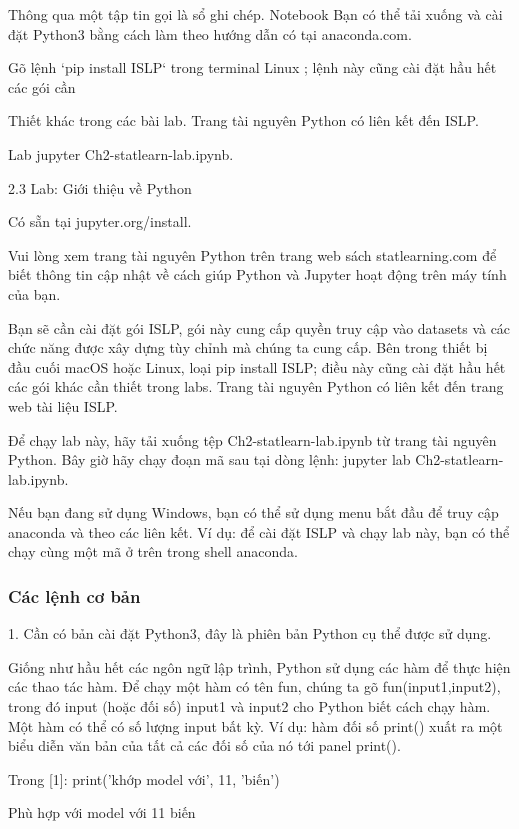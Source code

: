 Thông qua một tập tin gọi là sổ ghi chép. Notebook Bạn có thể tải xuống và cài đặt Python3 bằng cách làm theo hướng dẫn có tại anaconda.com.

Gõ lệnh `pip install ISLP` trong terminal Linux ; lệnh này cũng cài đặt hầu hết các gói cần

Thiết khác trong các bài lab. Trang tài nguyên Python có liên kết đến ISLP.

Lab jupyter Ch2-statlearn-lab.ipynb.

2.3 Lab: Giới thiệu về Python

Có sẵn tại jupyter.org/install.

Vui lòng xem trang tài nguyên Python trên trang web sách statlearning.com để biết thông tin cập nhật về cách giúp Python và Jupyter hoạt động trên máy tính của bạn.

Bạn sẽ cần cài đặt gói ISLP, gói này cung cấp quyền truy cập vào datasets và các chức năng được xây dựng tùy chỉnh mà chúng ta cung cấp. Bên trong thiết bị đầu cuối macOS hoặc Linux, loại pip install ISLP; điều này cũng cài đặt hầu hết các gói khác cần thiết trong labs. Trang tài nguyên Python có liên kết đến trang web tài liệu ISLP.

Để chạy lab này, hãy tải xuống tệp Ch2-statlearn-lab.ipynb từ trang tài nguyên Python. Bây giờ hãy chạy đoạn mã sau tại dòng lệnh: jupyter lab Ch2-statlearn-lab.ipynb.

Nếu bạn đang sử dụng Windows, bạn có thể sử dụng menu bắt đầu để truy cập anaconda và theo các liên kết. Ví dụ: để cài đặt ISLP và chạy lab này, bạn có thể chạy cùng một mã ở trên trong shell anaconda.

\subsubsection{Các lệnh cơ bản}

1. Cần có bản cài đặt Python3, đây là phiên bản Python cụ thể được sử dụng.

Giống như hầu hết các ngôn ngữ lập trình, Python sử dụng các hàm để thực hiện các thao tác hàm. Để chạy một hàm có tên fun, chúng ta gõ fun(input1,input2), trong đó input (hoặc đối số) input1 và input2 cho Python biết cách chạy hàm. Một hàm có thể có số lượng input bất kỳ. Ví dụ: hàm đối số print() xuất ra một biểu diễn văn bản của tất cả các đối số của nó tới panel print().

Trong [1]: print('khớp model với', 11, 'biến')

Phù hợp với model với 11 biến

